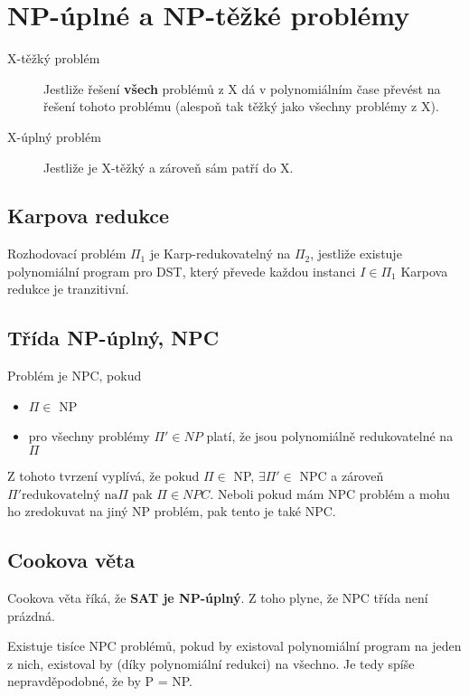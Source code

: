 \section{NP-úplné a NP-těžké problémy}

\begin{description}
    \item[X-těžký problém] Jestliže řešení \textbf{všech} problémů z X dá v polynomiálním čase převést na řešení tohoto problému (alespoň tak těžký jako všechny problémy z X).
    \item[X-úplný problém] Jestliže je X-těžký a zároveň sám patří do X.
\end{description}

\subsection{Karpova redukce}

Rozhodovací problém $\Pi_1$ je Karp-redukovatelný na $\Pi_2$, jestliže existuje polynomiální program pro DST, který převede každou instanci $I \in \Pi_1$ 
Karpova redukce je tranzitivní.

\subsection{Třída NP-úplný, NPC}

Problém je NPC, pokud

\begin{itemize}
    \item $\Pi \in$ NP
    \item pro všechny problémy $\Pi' \in NP$ platí, že jsou polynomiálně redukovatelné na $\Pi$
\end{itemize}

Z tohoto tvrzení vyplívá, že pokud $\Pi \in$ NP, $\exists \Pi' \in$ NPC a zároveň $\Pi' \textrm{redukovatelný na} \Pi$ pak $\Pi \in NPC$.
Neboli pokud mám NPC problém a mohu ho zredokuvat na jiný NP problém, pak tento je také NPC.

\subsection{Cookova věta}

Cookova věta říká, že \textbf{SAT je NP-úplný}.
Z toho plyne, že NPC třída není prázdná.

Existuje tisíce NPC problémů, pokud by existoval polynomiální program na jeden z nich, existoval by (díky polynomiální redukci) na všechno.
Je tedy spíše nepravděpodobné, že by P = NP.


